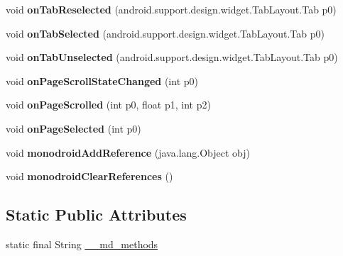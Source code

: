 \begin{DoxyCompactItemize}
void {\bfseries on\+Tab\+Reselected} (android.\+support.\+design.\+widget.\+Tab\+Layout.\+Tab p0)
\item 
\mbox{\label{classmd5270abb39e60627f0f200893b490a1ade_1_1TabbedPageRenderer_ab3b382046f76dcb461f46c32f878ce21}} 
void {\bfseries on\+Tab\+Selected} (android.\+support.\+design.\+widget.\+Tab\+Layout.\+Tab p0)
\item 
\mbox{\label{classmd5270abb39e60627f0f200893b490a1ade_1_1TabbedPageRenderer_a34344ed4429e52347801b12b7a69da61}} 
void {\bfseries on\+Tab\+Unselected} (android.\+support.\+design.\+widget.\+Tab\+Layout.\+Tab p0)
\item 
\mbox{\label{classmd5270abb39e60627f0f200893b490a1ade_1_1TabbedPageRenderer_a6ee3c70ee2769ea4ce88b1c0e7accd74}} 
void {\bfseries on\+Page\+Scroll\+State\+Changed} (int p0)
\item 
\mbox{\label{classmd5270abb39e60627f0f200893b490a1ade_1_1TabbedPageRenderer_a2be7798b85b19ace799e0aac88245757}} 
void {\bfseries on\+Page\+Scrolled} (int p0, float p1, int p2)
\item 
\mbox{\label{classmd5270abb39e60627f0f200893b490a1ade_1_1TabbedPageRenderer_a1d0954491d422f9bedb21658957b4bfb}} 
void {\bfseries on\+Page\+Selected} (int p0)
\item 
\mbox{\label{classmd5270abb39e60627f0f200893b490a1ade_1_1TabbedPageRenderer_ac61a8f262b7596ff2eb4e667464f9d36}} 
void {\bfseries monodroid\+Add\+Reference} (java.\+lang.\+Object obj)
\item 
\mbox{\label{classmd5270abb39e60627f0f200893b490a1ade_1_1TabbedPageRenderer_a3b2f80dac52df3f43f79ec6bd4748239}} 
void {\bfseries monodroid\+Clear\+References} ()
\end{DoxyCompactItemize}
\subsection*{Static Public Attributes}
\begin{DoxyCompactItemize}
\item 
static final String \hyperlink{classmd5270abb39e60627f0f200893b490a1ade_1_1TabbedPageRenderer_a61bf05aab3c9447ee5d368ab4be86a41}{\+\_\+\+\_\+md\+\_\+methods}
\end{DoxyCompactItemize}
